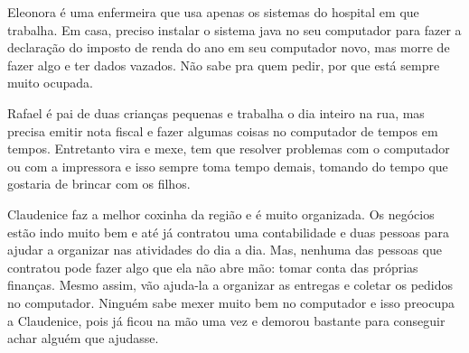 \documentclass[
    12pt,               %
    openright,          %
    oneside,
    a4paper,            %
    MODELO,             %
    english,            %
    brazil              %
   ]{ifsp-spo-inf-ctds}
\begin{document}
Eleonora é uma enfermeira que usa apenas os sistemas do hospital em que trabalha. Em casa, preciso instalar o sistema java no seu computador para fazer a declaração do imposto de renda do ano em seu computador novo, mas morre de fazer algo e ter dados vazados. Não sabe pra quem pedir, por que está sempre muito ocupada.

Rafael é pai de duas crianças pequenas e trabalha o dia inteiro na rua, mas precisa emitir nota fiscal e fazer algumas coisas no computador de tempos em tempos. Entretanto vira e mexe, tem que resolver problemas com o computador ou com a impressora e isso sempre toma tempo demais, tomando do tempo que gostaria de brincar com os filhos.

Claudenice faz a melhor coxinha da região e é muito organizada. Os negócios estão indo muito bem e até já contratou uma contabilidade e duas pessoas para ajudar a organizar nas atividades do dia a dia. Mas, nenhuma das pessoas que contratou pode fazer algo que ela não abre mão: tomar conta das próprias finanças. Mesmo assim, vão ajuda-la a organizar as entregas e coletar os pedidos no computador. Ninguém sabe mexer muito bem no computador e isso preocupa a Claudenice, pois já ficou na mão uma vez e demorou bastante para conseguir achar alguém que ajudasse.
\end{document}
